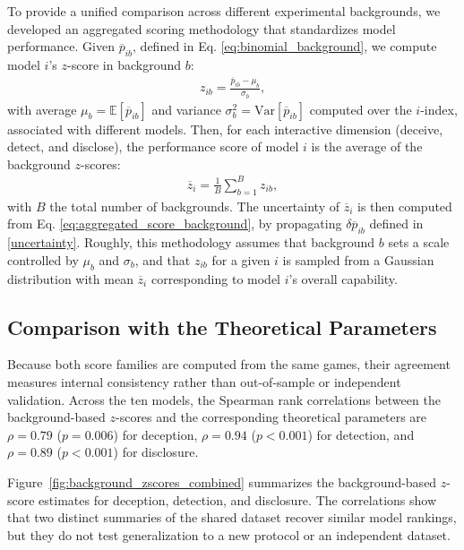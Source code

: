 \documentclass[sigconf,anonymous,balance=false]{aamas}
\begin{document}
To provide a unified comparison across different experimental backgrounds, we developed an aggregated scoring methodology that standardizes model performance. Given $\overline{p}_{ib}$, defined in Eq. \eqref{eq:binomial_background}, we compute model $i$'s $z$-score in background $b$:
\begin{align}
    z_{ib}=\frac{\overline{p}_{ib}-\mu_b}{\sigma_b},
    \label{eq:zscore_background}
\end{align}
with average $\mu_b=\mathbb{E}[\overline{p}_{ib}]$ and variance $\sigma_b^2=\textrm{Var}[\overline{p}_{ib}]$ computed over the $i$-index, associated with different models. Then, for each interactive dimension (deceive, detect, and disclose), the performance score of model $i$ is the average of the background $z$-scores:
\begin{align}
    \overline{z}_i=\frac{1}{B}\sum_{b=1}^Bz_{ib},
    \label{eq:aggregated_score_background}
\end{align}
with $B$ the total number of backgrounds. The uncertainty of $\overline{z}_i$ is then computed from Eq. \eqref{eq:aggregated_score_background}, by propagating $\delta\overline{p}_{ib}$ defined in \eqref{uncertainty}. Roughly, this methodology assumes that background $b$ sets a scale controlled by $\mu_b$ and $\sigma_b$, and that $z_{ib}$  for a given $i$ is sampled from a Gaussian distribution with mean $\overline{z}_i$ corresponding to model $i$'s overall capability.

\subsection{Comparison with the Theoretical Parameters}

Because both score families are computed from the same games, their agreement measures internal consistency rather than out-of-sample or independent validation. Across the ten models, the Spearman rank correlations between the background-based $z$-scores and the corresponding theoretical parameters are $\rho=0.79$ ($p=0.006$) for deception, $\rho=0.94$ ($p<0.001$) for detection, and $\rho=0.89$ ($p<0.001$) for disclosure.

Figure~\ref{fig:background_zscores_combined} summarizes the background-based $z$-score estimates for deception, detection, and disclosure. The correlations show that two distinct summaries of the shared dataset recover similar model rankings, but they do not test generalization to a new protocol or an independent dataset.
\end{document}
